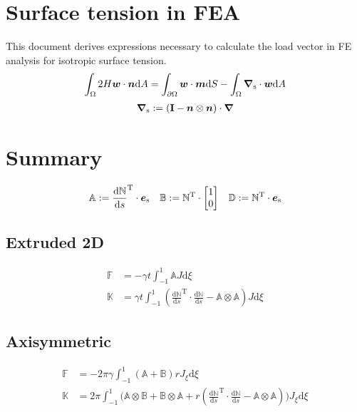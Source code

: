 \documentclass[a4paper,11pt]{article}
\newcommand{\ta}[1]{\text{\boldmath $#1$}} %
\newcommand{\ts}[1]{\text{\boldmath $\mathrm{#1}$}} %
\newcommand{\uv}[1]{\mathbb{#1}}
\newcommand{\um}[1]{\mathbb{#1}}
\newcommand{\dif}[1]{\mathrm{d}#1}
\newcommand{\diff}{\ta{\nabla}}
\newcommand{\dderiv}[2]{\frac{\mathrm{d}#1}{\mathrm{d}#2}}
\newcommand{\T}{\mathrm{T}}
\newcommand{\surf}{\mathrm{s}}
\newcommand{\defeq}{:=}
\newcommand{\boundary}{\text{boundary}}
\DeclareMathOperator{\sign}{sign}
\begin{document}
\section{Surface tension in FEA}
This document derives expressions necessary to calculate the load vector in FE analysis for isotropic surface tension.
\begin{align}
 \int_\Omega 2 H \ta w\cdot \ta n\dif A = \int_{\partial\Omega} \ta w\cdot\ta m\dif S - \int_\Omega \diff_\surf \cdot \ta w \dif A
 \label{eq:curvature}
\end{align}
\begin{align}
 \diff_\surf \defeq \left(\ts I - \ta n\otimes\ta n \right)\cdot \diff
\end{align}

\section{Summary}
\begin{align}
\uv A &\defeq \dderiv{{\um N}}{s}^\T \cdot \ta e_\surf & \uv B &\defeq {\um N}^\T \cdot \begin{bmatrix}1\\0\end{bmatrix} & \uv D \defeq \uv N^\T \cdot \ta e_\surf
\end{align}
\subsection{Extruded 2D}
\begin{align}
 \uv F &= -\gamma t \int_{-1}^{1} \uv A J\dif\xi\\
 \um K &= \gamma t \int_{-1}^{1} \left(\dderiv{\um N}{s}^\T\cdot\dderiv{\um N}{s} - \uv A\otimes\uv A\right) J \dif\xi
\end{align}

\subsection{Axisymmetric}
\begin{align}
  \uv F &= -2\pi \gamma \int_{-1}^{1} \left(\uv A + \uv B\right) r J_\xi\dif\xi\\
  \um K &= 2\pi \int_{-1}^{1} \bigg(
	\uv A \otimes \uv B +
	\uv B \otimes \uv A +
	r \left(\dderiv{\um N}{s}^\T \cdot \dderiv{\um N}{s} - \uv A\otimes \uv A\right)
	\bigg) J_\xi \dif\xi
\end{align}
\end{document}
